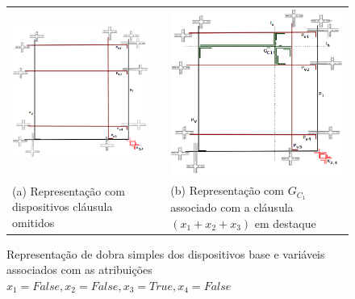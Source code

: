 \begin{figure}[h]
  \centering
  \begin{tabular}{p{10cm} p{2cm} p{10cm}}
   \centering \includegraphics[width=10cm, left]{./img/gf3.png} & & \includegraphics[width=10cm, left]{./img/formulaCompletaGFonePiePlusLines.png} \\  
  [\abovecaptionskip]
    \footnotesize \centering (a) Representação com dispositivos cláusula omitidos & & \footnotesize(b) Representação  com  $G_{C_1}$  associado com a cláusula $(x_1+x_2+x_3)$ em destaque \\
  \end{tabular}

 \caption{Representação de dobra simples dos dispositivos base e variáveis associados com as atribuições $x_1=False, x_2=False, x_3=True, x_4=False$} \label{fig:gadgetOnePie} \label{fig:gadgetBasePlusVariables}
\end{figure}
